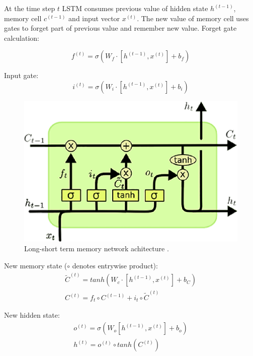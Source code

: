 At the time step $t$ LSTM consumes previous value of hidden state $h^{(t-1)}$, memory cell $c^{(t-1)}$ and input vector $x^{(t)}$. The new value of memory cell uses gates to forget part of previous value and remember new value. Forget gate calculation:

\begin{equation}
f^{(t)} = \sigma(W_f\cdot[h^{(t-1)},x^{(t)}] + b_f)
\label{lstm:ft}
\end{equation} 

Input gate:
\begin{equation}
i^{(t)}=\sigma(W_i\cdot[h^{(t-1)}, x^{(t)}]+b_i)
\label{lstm:input}
\end{equation} 

\begin{figure}[h]
\centering
\includegraphics{Figures/lstm}
\decoRule
\caption[Long-short term memory]{Long-short term memory network achitecture \parencite{lstm-picture}.}
\label{fig:word_embeddings}
\end{figure}

New memory state ($\circ$ denotes entrywise product):
\begin{equation}
\begin{gathered}
\widetilde{C}^{(t)} = tanh(W_c\cdot[h^{(t-1)}, x^{(t)}]+b_C) \\

C^{(t)} = f_t\circ C^{(t-1)}+i_t\circ\widetilde{C}^{(t)}
\end{gathered}
\label{lstm:c}
\end{equation} 

New hidden state:
\begin{equation}
\begin{gathered}
o^{(t)}=\sigma(W_o[h^{(t-1)},x^{(t)}]+b_o) \\

h^{(t)}=o^{(t)}\circ tanh(C^{(t)})
\end{gathered}
\label{lstm:h}
\end{equation} 

